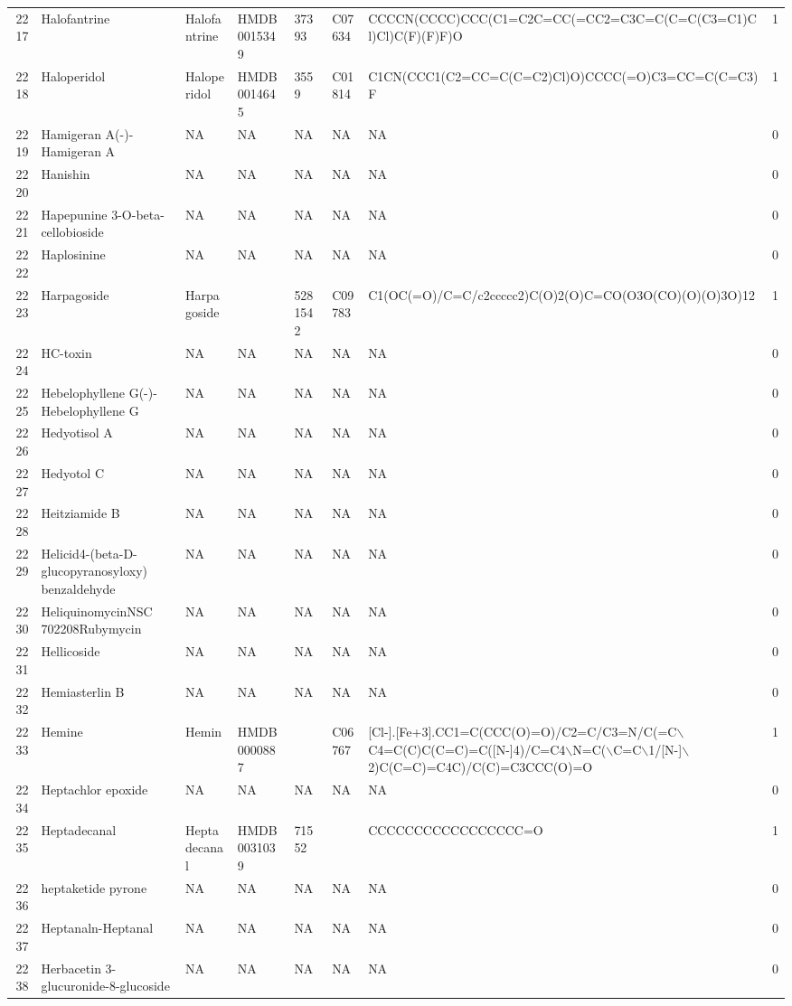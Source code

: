 \documentclass[a4paper]{article}
\begin{document}
\begin{longtable}{rlllllll}
  2217 & Halofantrine & Halofantrine & HMDB0015349 & 37393 & C07634 & CCCCN(CCCC)CCC(C1=C2C=CC(=CC2=C3C=C(C=C(C3=C1)Cl)Cl)C(F)(F)F)O & 1 \\ 
  2218 & Haloperidol & Haloperidol & HMDB0014645 & 3559 & C01814 & C1CN(CCC1(C2=CC=C(C=C2)Cl)O)CCCC(=O)C3=CC=C(C=C3)F & 1 \\ 
  2219 & Hamigeran A(-)-Hamigeran A & NA & NA & NA & NA & NA & 0 \\ 
  2220 & Hanishin & NA & NA & NA & NA & NA & 0 \\ 
  2221 & Hapepunine 3-O-beta-cellobioside & NA & NA & NA & NA & NA & 0 \\ 
  2222 & Haplosinine & NA & NA & NA & NA & NA & 0 \\ 
  2223 & Harpagoside & Harpagoside &  & 5281542 & C09783 & C1(OC(=O)/C=C/c2ccccc2)C(O)2(O)C=CO(O3O(CO)(O)(O)3O)12 & 1 \\ 
  2224 & HC-toxin & NA & NA & NA & NA & NA & 0 \\ 
  2225 & Hebelophyllene G(-)-Hebelophyllene G & NA & NA & NA & NA & NA & 0 \\ 
  2226 & Hedyotisol A & NA & NA & NA & NA & NA & 0 \\ 
  2227 & Hedyotol C & NA & NA & NA & NA & NA & 0 \\ 
  2228 & Heitziamide B & NA & NA & NA & NA & NA & 0 \\ 
  2229 & Helicid4-(beta-D-glucopyranosyloxy) benzaldehyde & NA & NA & NA & NA & NA & 0 \\ 
  2230 & HeliquinomycinNSC 702208Rubymycin & NA & NA & NA & NA & NA & 0 \\ 
  2231 & Hellicoside & NA & NA & NA & NA & NA & 0 \\ 
  2232 & Hemiasterlin B & NA & NA & NA & NA & NA & 0 \\ 
  2233 & Hemine & Hemin & HMDB0000887 &  & C06767 & [Cl-].[Fe+3].CC1=C(CCC(O)=O)/C2=C/C3=N/C(=C$\backslash$C4=C(C)C(C=C)=C([N-]4)/C=C4$\backslash$N=C($\backslash$C=C$\backslash$1/[N-]$\backslash$2)C(C=C)=C4C)/C(C)=C3CCC(O)=O & 1 \\ 
  2234 & Heptachlor epoxide & NA & NA & NA & NA & NA & 0 \\ 
  2235 & Heptadecanal & Heptadecanal & HMDB0031039 & 71552 &  & CCCCCCCCCCCCCCCCC=O & 1 \\ 
  2236 & heptaketide pyrone & NA & NA & NA & NA & NA & 0 \\ 
  2237 & Heptanaln-Heptanal & NA & NA & NA & NA & NA & 0 \\ 
  2238 & Herbacetin 3-glucuronide-8-glucoside & NA & NA & NA & NA & NA & 0 \\ 

\end{longtable}
\end{document}
